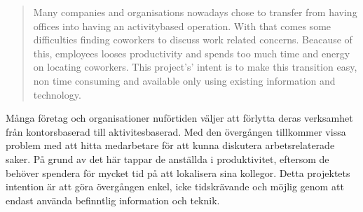 \documentclass[a4paper,12pt]{article}
\begin{document}
\begin{abstract}
Many companies and organisations nowadays chose to transfer from having offices into having an activitybased operation. With that comes some difficulties finding coworkers to discuss work related concerns. Beacause of this, employees looses productivity and spends too much time and energy on locating coworkers. This project's' intent is to make this transition easy, non time consuming and available only using existing information and technology.
\end{abstract}
\begin{sammanfattning}
%
%
Många företag och organisationer nuförtiden väljer att förlytta deras verksamhet från kontorsbaserad till aktivitesbaserad. Med den övergången tillkommer vissa problem med att hitta medarbetare för att kunna diskutera arbetsrelaterade saker. På grund av det här tappar de anställda i produktivitet, eftersom de behöver spendera för mycket tid på att lokalisera sina kollegor. Detta projektets intention är att göra övergången enkel, icke tidskrävande och möjlig genom att endast använda befinntlig information och teknik.
\end{sammanfattning}
\end{document}
